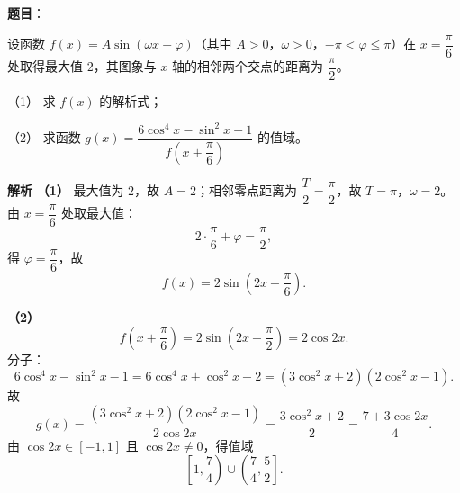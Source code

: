 \begin{answer}

\textbf{题目}：

设函数 $f(x)=A\sin(\omega x+\varphi)$（其中 $A>0$，$\omega>0$，$-\pi<\varphi\leqslant\pi$）在 $x=\dfrac\pi6$ 处取得最大值 $2$，其图象与 $x$ 轴的相邻两个交点的距离为 $\dfrac\pi2$。

（1） 求 $f(x)$ 的解析式；

（2） 求函数 $g(x)=\dfrac{6\cos^4x-\sin^2x-1}{f\left(x+\dfrac\pi6\right)}$ 的值域。

\textbf{解析}
\textbf{（1）} 最大值为 $2$，故 $A=2$；相邻零点距离为 $\dfrac T2=\dfrac\pi2$，故 $T=\pi$，$\omega=2$。由 $x=\dfrac\pi6$ 处取最大值：
\nopagebreak[4]
\[2\cdot\frac\pi6+\varphi=\frac\pi2,\]
得 $\varphi=\dfrac\pi6$，故
\nopagebreak[4]
\[f(x)=2\sin\left(2x+\frac\pi6\right).\]

\textbf{（2）}
\nopagebreak[4]
\[f\left(x+\frac\pi6\right)=2\sin\left(2x+\frac\pi2\right)=2\cos2x.\]
分子：
\nopagebreak[4]
\[6\cos^4x-\sin^2x-1=6\cos^4x+\cos^2x-2=(3\cos^2x+2)(2\cos^2x-1).\]
故
\nopagebreak[4]
\[g(x)=\frac{(3\cos^2x+2)(2\cos^2x-1)}{2\cos2x}=\frac{3\cos^2x+2}2=\frac{7+3\cos2x}4.\]
由 $\cos2x\in[-1,1]$ 且 $\cos2x\neq0$，得值域
\nopagebreak[4]
\[\left[1,\frac74\right)\cup\left(\frac74,\frac52\right].\]



\end{answer}
